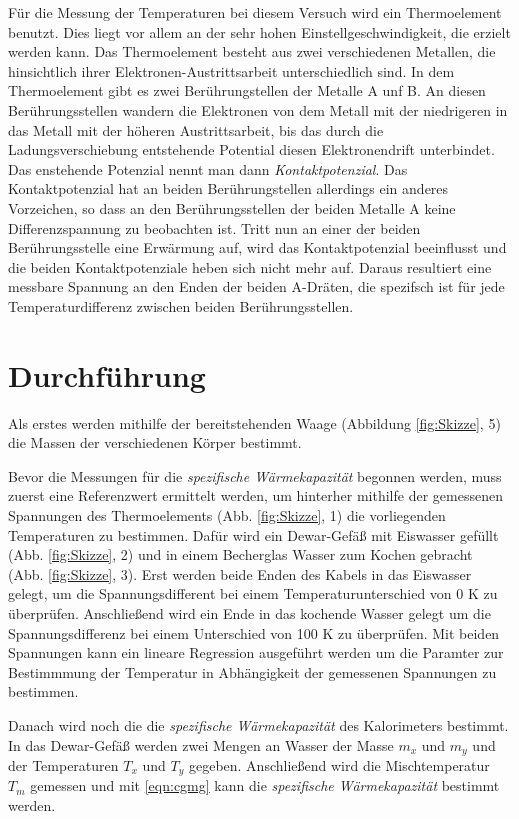 Für die Messung der Temperaturen bei diesem Versuch wird ein Thermoelement benutzt.
Dies liegt vor allem an der sehr hohen Einstellgeschwindigkeit, die erzielt werden
kann. Das Thermoelement besteht aus zwei verschiedenen Metallen, die hinsichtlich
ihrer Elektronen-Austrittsarbeit unterschiedlich sind. In dem Thermoelement gibt
es zwei Berührungstellen der Metalle A unf B. An diesen Berührungsstellen
wandern die Elektronen von dem Metall mit der niedrigeren in das Metall mit der
höheren Austrittsarbeit, bis das durch die Ladungsverschiebung entstehende Potential
diesen Elektronendrift unterbindet. Das enstehende Potenzial nennt man dann
\emph{Kontaktpotenzial}. Das Kontaktpotenzial hat an beiden Berührungstellen
allerdings ein anderes Vorzeichen, so dass an den Berührungsstellen der beiden
Metalle A keine Differenzspannung zu beobachten ist. Tritt nun an einer der beiden
Berührungsstelle eine Erwärmung auf, wird das Kontaktpotenzial beeinflusst und
die beiden Kontaktpotenziale heben sich nicht mehr auf. Daraus resultiert eine
messbare Spannung an den Enden der beiden A-Dräten, die spezifsch ist für jede
Temperaturdifferenz zwischen beiden Berührungsstellen.

\section{Durchführung}

Als erstes werden mithilfe der bereitstehenden Waage (Abbildung \ref{fig:Skizze}, 5)
die Massen der verschiedenen Körper bestimmt.

Bevor die Messungen für die \emph{spezifische Wärmekapazität} begonnen werden,
muss zuerst eine Referenzwert ermittelt werden, um hinterher mithilfe der gemessenen
Spannungen des Thermoelements (Abb. \ref{fig:Skizze}, 1) die vorliegenden Temperaturen zu bestimmen.
Dafür wird ein Dewar-Gefäß mit Eiswasser gefüllt (Abb. \ref{fig:Skizze}, 2) und in einem Becherglas
Wasser zum Kochen gebracht (Abb. \ref{fig:Skizze}, 3). Erst werden
beide Enden des Kabels in das Eiswasser gelegt, um die Spannungsdifferent bei
einem Temperaturunterschied von 0 K zu überprüfen. Anschließend wird ein Ende in
das kochende Wasser gelegt um die Spannungsdifferenz bei einem Unterschied von
100 K zu überprüfen. Mit beiden Spannungen kann ein lineare Regression ausgeführt
werden um die Paramter zur Bestimmmung der Temperatur in Abhängigkeit der
gemessenen Spannungen zu bestimmen.

Danach wird noch die die \emph{spezifische Wärmekapazität} des Kalorimeters bestimmt.
In das Dewar-Gefäß werden zwei Mengen an Wasser der Masse $m_x$ und $m_y$ und der
Temperaturen $T_x$ und $T_y$ gegeben. Anschließend wird die Mischtemperatur
$T_m$ gemessen und mit \eqref{eqn:cgmg} kann die \emph{spezifische Wärmekapazität}
bestimmt werden.

